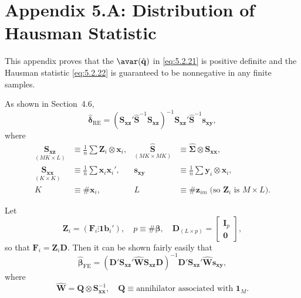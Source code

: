
\section*{Appendix 5.A: Distribution of Hausman Statistic}
\label{sec:5.A}

This appendix proves that the $\avar(\hat{\mathbf{q}})$ in \eqref{eq:5.2.21} is positive definite and the Hausman
statistic \eqref{eq:5.2.22} is guaranteed to be nonnegative in any finite samples.

As shown in Section~4.6,
\begin{equation}
  \hat{\boldsymbol{\delta}}_{\text{RE}}
  = (\mathbf{S}_{\mathbf{xz}}'\hat{\mathbf{S}}^{-1}\mathbf{S}_{\mathbf{xz}})^{-1}
    \mathbf{S}_{\mathbf{xz}}'\hat{\mathbf{S}}^{-1}\mathbf{s}_{\mathbf{xy}},
  \label{eq:5.A.1} \tag{5.A.1}
\end{equation}
where
\begin{align*}
  \underset{(MK \times L)}{\mathbf{S}_{\mathbf{xz}}}
  &\equiv \frac{1}{n}\sum \mathbf{Z}_i \otimes \mathbf{x}_i, &
  \underset{(MK \times MK)}{\hat{\mathbf{S}}}
  &\equiv \hat{\boldsymbol{\Sigma}} \otimes \mathbf{S}_{\mathbf{xx}}, \\
  \underset{(K \times K)}{\mathbf{S}_{\mathbf{xx}}}
  &\equiv \frac{1}{n}\sum \mathbf{x}_i\mathbf{x}_i', &
  \mathbf{s}_{\mathbf{xy}}
  &\equiv \frac{1}{n}\sum \mathbf{y}_i \otimes \mathbf{x}_i, \\
  K &\equiv \#\mathbf{x}_i, & L &\equiv \#\mathbf{z}_{im}
  \;\text{(so $\mathbf{Z}_i$ is $M \times L$)}.
\end{align*}

Let
\[
  \mathbf{Z}_i = (\mathbf{F}_i \vdots \mathbf{1}\mathbf{b}_i'), \quad
  p \equiv \#\boldsymbol{\beta}, \quad
  \mathbf{D}_{(L \times p)} = \begin{bmatrix} \mathbf{I}_p \\ \mathbf{0} \end{bmatrix},
\]
so that $\mathbf{F}_i = \mathbf{Z}_i\mathbf{D}$. Then it can be shown fairly easily that
\begin{equation}
  \hat{\boldsymbol{\beta}}_{\text{FE}}
  = (\mathbf{D}'\mathbf{S}_{\mathbf{xz}}'\hat{\mathbf{W}}\mathbf{S}_{\mathbf{xz}}\mathbf{D})^{-1}
    \mathbf{D}'\mathbf{S}_{\mathbf{xz}}'\hat{\mathbf{W}}\mathbf{s}_{\mathbf{xy}},
  \label{eq:5.A.2} \tag{5.A.2}
\end{equation}
where
\[
  \hat{\mathbf{W}} = \mathbf{Q} \otimes \mathbf{S}_{\mathbf{xx}}^{-1}, \quad
  \mathbf{Q} \equiv \text{annihilator associated with } \mathbf{1}_M.
\]

